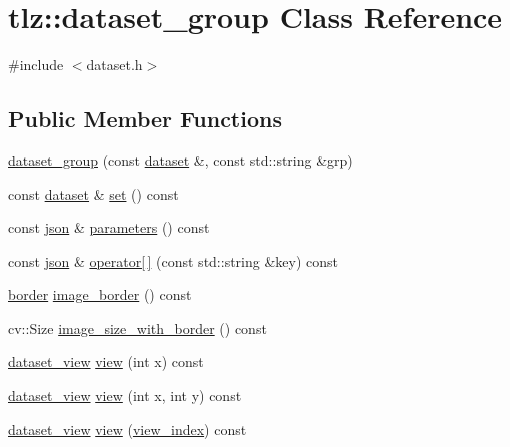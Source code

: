 \hypertarget{classtlz_1_1dataset__group}{}\section{tlz\+:\+:dataset\+\_\+group Class Reference}
\label{classtlz_1_1dataset__group}


{\ttfamily \#include $<$dataset.\+h$>$}

\subsection*{Public Member Functions}
\begin{DoxyCompactItemize}
\item 
\hyperlink{classtlz_1_1dataset__group_acad4f6300bfc455279aaeb975d5e61de}{dataset\+\_\+group} (const \hyperlink{classtlz_1_1dataset}{dataset} \&, const std\+::string \&grp)
\item 
const \hyperlink{classtlz_1_1dataset}{dataset} \& \hyperlink{classtlz_1_1dataset__group_a4cc740eed6929b9f06a2157120740a7f}{set} () const 
\item 
const \hyperlink{namespacetlz_ac400657dfcddf6309a769aefc23eed0c}{json} \& \hyperlink{classtlz_1_1dataset__group_ac89fe02ba32a12258eadf8d91ef1fa37}{parameters} () const 
\item 
const \hyperlink{namespacetlz_ac400657dfcddf6309a769aefc23eed0c}{json} \& \hyperlink{classtlz_1_1dataset__group_a1d9b6e42f4073223598d2a15064963e9}{operator\mbox{[}$\,$\mbox{]}} (const std\+::string \&key) const 
\item 
\hyperlink{structtlz_1_1border}{border} \hyperlink{classtlz_1_1dataset__group_a1b2ebd9009b660773532e42691dc301e}{image\+\_\+border} () const 
\item 
cv\+::\+Size \hyperlink{classtlz_1_1dataset__group_a782b8049db0faa9ecfd0f7b0d6f31766}{image\+\_\+size\+\_\+with\+\_\+border} () const 
\item 
\hyperlink{classtlz_1_1dataset__view}{dataset\+\_\+view} \hyperlink{classtlz_1_1dataset__group_aa0c9157fd56b01adebcecdcdd98f9e3f}{view} (int x) const 
\item 
\hyperlink{classtlz_1_1dataset__view}{dataset\+\_\+view} \hyperlink{classtlz_1_1dataset__group_a11b07352a490b962c5c551f357456a63}{view} (int x, int y) const 
\item 
\hyperlink{classtlz_1_1dataset__view}{dataset\+\_\+view} \hyperlink{classtlz_1_1dataset__group_a50eabb3f88e88322d793fe3725f8a41c}{view} (\hyperlink{structtlz_1_1view__index}{view\+\_\+index}) const 
\end{DoxyCompactItemize}


